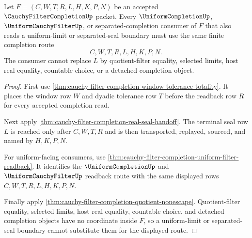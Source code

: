 \begin{theorem}
\label{thm:cauchy-filter-completion-uniform-limit-compatibility}
Let $F=(C,W,T,R,L,H,K,P,N)$ be an accepted $\CauchyFilterCompletionUp$ packet. Every $\UniformCompletionUp$, $\UniformCauchyFilterUp$, or separated-completion consumer of $F$ that also reads a uniform-limit or separated-seal boundary must use the same finite completion route
$$
C,W,T,R,L,H,K,P,N .
$$
The consumer cannot replace $L$ by quotient-filter equality, selected limits, host real equality, countable choice, or a detached completion object.
\end{theorem}
\begin{proof}
First use \autoref{thm:cauchy-filter-completion-window-tolerance-totality}. It places the window row $W$ and dyadic tolerance row $T$ before the readback row $R$ for every accepted completion read.

Next apply \autoref{thm:cauchy-filter-completion-real-seal-handoff}. The terminal seal row $L$ is reached only after $C,W,T,R$ and is then transported, replayed, sourced, and named by $H,K,P,N$.

For uniform-facing consumers, use \autoref{thm:cauchy-filter-completion-uniform-filter-readback}. It identifies the $\UniformCompletionUp$ and $\UniformCauchyFilterUp$ readback route with the same displayed rows $C,W,T,R,L,H,K,P,N$.

Finally apply \autoref{thm:cauchy-filter-completion-quotient-nonescape}. Quotient-filter equality, selected limits, host real equality, countable choice, and detached completion objects have no coordinate inside $F$, so a uniform-limit or separated-seal boundary cannot substitute them for the displayed route.
\end{proof}

